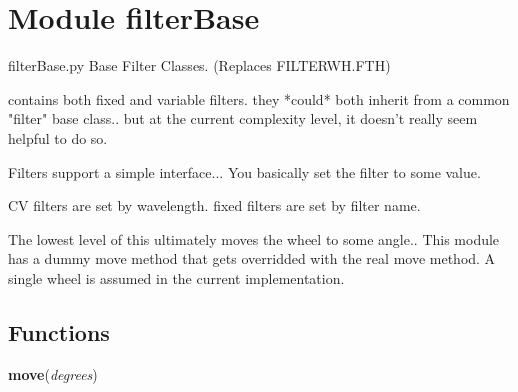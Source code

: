 %
%
%


\section{Module filterBase}

    \label{filterBase}
filterBase.py    Base Filter Classes. (Replaces FILTERWH.FTH)

contains both fixed and variable filters. they *could* both inherit from a 
common "filter" base class.. but at the current complexity level, it 
doesn't really seem helpful to do so.

Filters support a simple interface... You basically set the filter to some 
value.

CV filters are set by wavelength. fixed filters are set by filter name.

The lowest level of this ultimately moves the wheel to some angle.. This 
module has a dummy move method that gets overridded with the real move 
method. A single wheel is assumed in the current implementation.



  \subsection{Functions}

    \label{filterBase:move}

    \vspace{0.5ex}

    \begin{boxedminipage}{\textwidth}

    \raggedright \textbf{move}(\textit{degrees})

    \end{boxedminipage}


